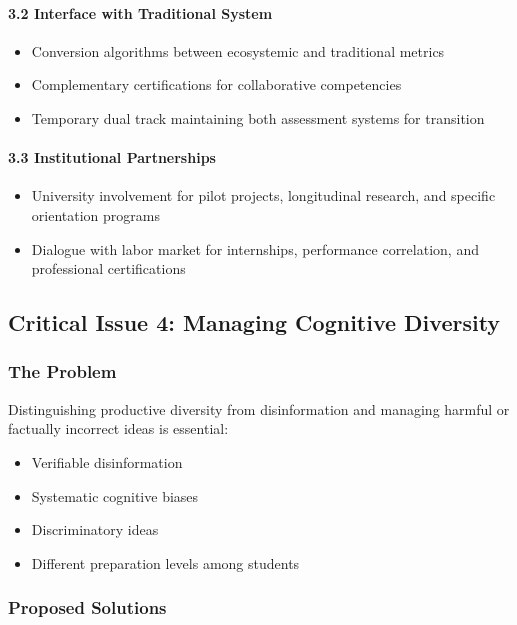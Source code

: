 \paragraph{3.2 Interface with Traditional System}
\begin{itemize}
	\item Conversion algorithms between ecosystemic and traditional metrics
	\item Complementary certifications for collaborative competencies
	\item Temporary dual track maintaining both assessment systems for transition
\end{itemize}

\paragraph{3.3 Institutional Partnerships}
\begin{itemize}
	\item University involvement for pilot projects, longitudinal research, and specific orientation programs
	\item Dialogue with labor market for internships, performance correlation, and professional certifications
\end{itemize}

\subsection{Critical Issue 4: Managing Cognitive Diversity}

\subsubsection*{The Problem}
Distinguishing productive diversity from disinformation and managing harmful or factually incorrect ideas is essential:
\begin{itemize}
	\item Verifiable disinformation
	\item Systematic cognitive biases
	\item Discriminatory ideas
	\item Different preparation levels among students
\end{itemize}

\subsubsection*{Proposed Solutions}

